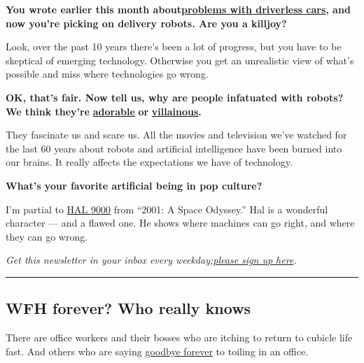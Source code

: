 \textbf{You wrote earlier this month
about\href{https://www.nytimes3xbfgragh.onion/2020/05/12/technology/self-driving-cars-coronavirus.html}{problems
with driverless cars}, and now you're picking on delivery robots. Are
you a killjoy?}

Look, over the past 10 years there's been a lot of progress, but you
have to be skeptical of emerging technology. Otherwise you get an
unrealistic view of what's possible and miss where technologies go
wrong.

\textbf{OK, that's fair. Now tell us, why are people infatuated with
robots? We think they're}
\textbf{\href{https://www.nytimes3xbfgragh.onion/2020/02/26/business/robots-retail-jobs.html}{adorable}}
\textbf{or}
\textbf{\href{https://www.nytimes3xbfgragh.onion/2020/04/08/movies/ai-humans-robots-technology.html}{villainous}.}

They fascinate us and scare us. All the movies and television we've
watched for the last 60 years about robots and artificial intelligence
have been burned into our brains. It really affects the expectations we
have of technology.

\textbf{What's your favorite artificial being in pop culture?}

I'm partial to
\href{https://www.nytimes3xbfgragh.onion/2018/03/30/movies/hal-2001-a-space-odyssey-voice-douglas-rain.html}{HAL
9000} from ``2001: A Space Odyssey.'' Hal is a wonderful character ---
and a flawed one. He shows where machines can go right, and where they
can go wrong.

\emph{Get this newsletter in your inbox every
weekday;}\href{https://www.nytimes3xbfgragh.onion/newsletters/signup/OT}{\emph{please
sign up here}}\emph{.}

\begin{center}\rule{0.5\linewidth}{\linethickness}\end{center}

\hypertarget{wfh-forever-who-really-knows}{%
\subsection{WFH forever? Who really
knows}\label{wfh-forever-who-really-knows}}

There are office workers and their bosses who are itching to return to
cubicle life fast. And others who are saying
\href{https://blog.twitter.com/en_us/topics/company/2020/keeping-our-employees-and-partners-safe-during-coronavirus.html}{goodbye
forever} to toiling in an office.


